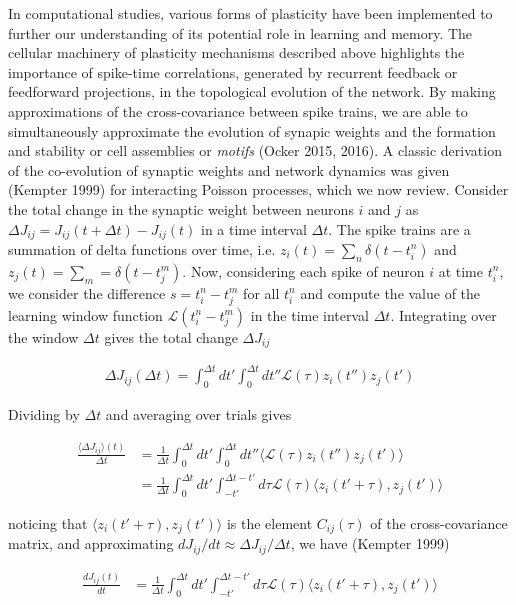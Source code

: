 \documentclass{ucetd}
\begin{document}
In computational studies, various forms of plasticity have been implemented to further our understanding of its potential role in learning and memory. The cellular machinery of plasticity mechanisms described above highlights the importance of spike-time correlations, generated by recurrent feedback or feedforward projections, in the topological evolution of the network. By making approximations of the cross-covariance between spike trains, we are able to simultaneously approximate the evolution of synapic weights and the formation and stability or cell assemblies or \emph{motifs} (Ocker 2015, 2016). A classic derivation of the co-evolution of synaptic weights and network dynamics was given (Kempter 1999) for interacting Poisson processes, which we now review. Consider the total change in the synaptic weight between neurons $i$ and $j$ as $\Delta J_{ij} = J_{ij}(t+\Delta t) - J_{ij}(t)$ in a time interval $\Delta t$. The spike trains are a summation of delta functions over time, i.e. $z_{i}(t) = \sum_{n} \delta(t-t_{i}^{n})$ and $z_{j}(t) = \sum_{m} = \delta(t-t_{j}^{m})$. Now, considering each spike of neuron $i$ at time $t_{i}^{n}$, we consider the difference $s = t_{i}^{n} - t_{j}^{m}$ for all $t_{i}^{n}$ and compute the value of the learning window function $\mathcal{L}(t_{i}^{n} - t_{j}^{m})$ in the time interval $\Delta t$. Integrating over the window $\Delta t$ gives the total change $\Delta J_{ij}$


\begin{align*}
\Delta J_{ij}(\Delta t) = \int_{0}^{\Delta t} dt'\int_{0}^{\Delta t} dt''\mathcal{L}(\tau)z_{i}(t'')z_{j}(t')
\end{align*}

Dividing by $\Delta t$ and averaging over trials gives 

\begin{align*}
\frac{\langle \Delta J_{ij}\rangle(t)}{\Delta t} &= \frac{1}{\Delta t}\int_{0}^{\Delta t} dt'\int_{0}^{\Delta t} dt''\langle\mathcal{L}(\tau)z_{i}(t'')z_{j}(t')\rangle\\
&= \frac{1}{\Delta t}\int_{0}^{\Delta t} dt'\int_{-t'}^{\Delta t - t'} d\tau\mathcal{L}(\tau)\langle z_{i}(t'+\tau), z_{j}(t')\rangle
\end{align*}

noticing that $\langle z_{i}(t'+\tau), z_{j}(t')\rangle$ is the element $C_{ij}(\tau)$ of the cross-covariance matrix, and approximating $dJ_{ij}/dt \approx \Delta J_{ij}/\Delta t$, we have (Kempter 1999)

\begin{align*}
\frac{d J_{ij}(t)}{dt} &=  \frac{1}{\Delta t}\int_{0}^{\Delta t} dt'\int_{-t'}^{\Delta t - t'} d\tau\mathcal{L}(\tau)\langle z_{i}(t'+\tau), z_{j}(t')\rangle
\end{align*}
\end{document}
